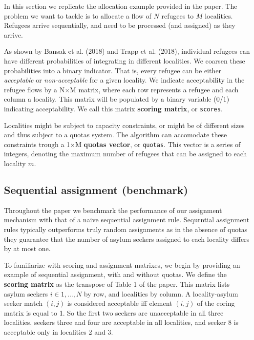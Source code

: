 \documentclass[11pt]{article}
\begin{document}
In this section we replicate the allocation example provided in the
paper. The problem we want to tackle is to allocate a flow of \(N\)
refugees to \(M\) localities. Refugees arrive sequentially, and need to
be processed (and assigned) as they arrive.

As shown by Bansak et al. (2018) and Trapp et al. (2018), individual
refugees can have different probabilities of integrating in different
localities. We coarsen these probabilities into a binary indicator. That
is, every refugee can be either \emph{acceptable} or
\emph{non-acceptable} for a given locality. We indicate acceptability in
the refugee flows by a N\(\times\)M matrix, where each row represents a
refugee and each column a locality. This matrix will be populated by a
binary variable (0/1) indicating acceptability. We call this matrix
\textbf{scoring matrix}, or \texttt{scores}.

Localities might be subject to capacity constraints, or might be of
different sizes and thus subject to a quotas system. The algorithm can
accomodate these constraints trough a 1\(\times\)M \textbf{quotas
vector}, or \texttt{quotas}. This vector is a series of integers,
denoting the maximum number of refugees that can be assigned to each
locality \(m\).

\hypertarget{sequential-assignment-benchmark}{%
\subsection{Sequential assignment
(benchmark)}\label{sequential-assignment-benchmark}}

Throughout the paper we benchmark the performance of our assignment
mechanism with that of a naive sequential assignment rule. Sequrntial
assignment rules typically outperforms truly random assignments as in
the absence of quotas they guarantee that the number of asylum seekers
assigned to each locality differs by at most one.

To familiarize with scoring and assignment matrixes, we begin by
providing an example of sequential assignment, with and without quotas.
We define the \textbf{scoring matrix} as the transpose of Table 1 of the
paper. This matrix lists asylum seekers \(i\in{1,\ldots,N}\) by row, and
localities by column. A locality-asylum seeker match \((i,j)\) is
considered acceptable iff element \((i,j)\) of the coring matrix is
equal to 1. So the first two seekers are unacceptable in all three
localities, seekers three and four are acceptable in all localities, and
seeker 8 is acceptable only in localities 2 and 3.
\end{document}
